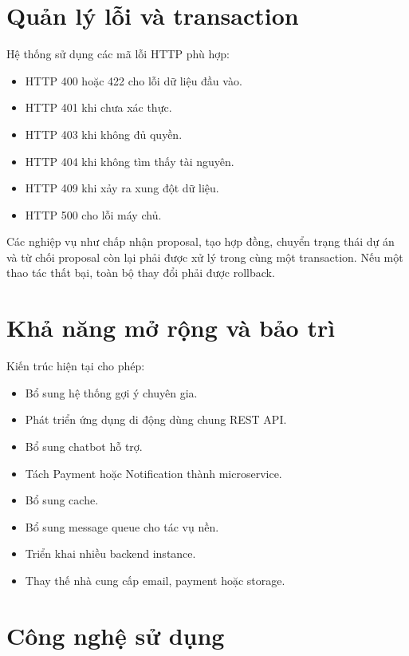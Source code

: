 \section{Quản lý lỗi và transaction}
\label{sec:error-transaction}

Hệ thống sử dụng các mã lỗi HTTP phù hợp:

\begin{itemize}
    \item HTTP 400 hoặc 422 cho lỗi dữ liệu đầu vào.
    \item HTTP 401 khi chưa xác thực.
    \item HTTP 403 khi không đủ quyền.
    \item HTTP 404 khi không tìm thấy tài nguyên.
    \item HTTP 409 khi xảy ra xung đột dữ liệu.
    \item HTTP 500 cho lỗi máy chủ.
\end{itemize}

Các nghiệp vụ như chấp nhận proposal, tạo hợp đồng, chuyển trạng thái dự án và từ chối proposal còn lại phải được xử lý trong cùng một transaction. Nếu một thao tác thất bại, toàn bộ thay đổi phải được rollback.

\section{Khả năng mở rộng và bảo trì}
\label{sec:scalability-maintainability}

Kiến trúc hiện tại cho phép:

\begin{itemize}
    \item Bổ sung hệ thống gợi ý chuyên gia.
    \item Phát triển ứng dụng di động dùng chung REST API.
    \item Bổ sung chatbot hỗ trợ.
    \item Tách Payment hoặc Notification thành microservice.
    \item Bổ sung cache.
    \item Bổ sung message queue cho tác vụ nền.
    \item Triển khai nhiều backend instance.
    \item Thay thế nhà cung cấp email, payment hoặc storage.
\end{itemize}

\section{Công nghệ sử dụng}
\label{sec:technology-stack}

